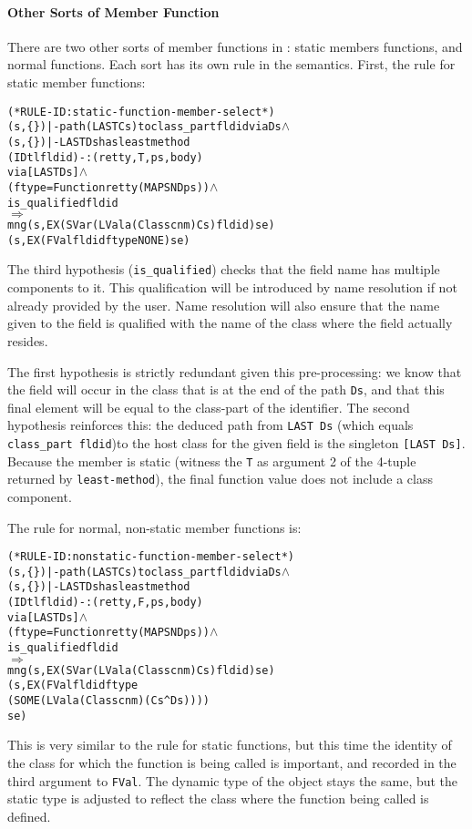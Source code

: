 \documentclass[11pt]{article}
\newcommand{\lbr}{\texttt{\{}}
\newcommand{\rbr}{\texttt{\}}}
\begin{document}
\paragraph{Other Sorts of Member Function}

There are two other sorts of member functions in \cpp{}: static
members functions, and normal functions.  Each sort has its own rule
in the semantics.    
First, the rule for static member functions: 
\begin{alltt}
(* RULE-ID: static-function-member-select *)
     (s,\lbr\rbr) |- path (LAST Cs) to class_part fldid via Ds \(\land\)
     (s,\lbr\rbr) |- LAST Ds has least method 
                  (IDtl fldid) -: (retty,T,ps,body)
                  via [LAST Ds] \(\land\)
     (ftype = Function retty (MAP SND ps)) \(\land\)
     is_qualified fldid
   \(\Rightarrow\)
     mng (s, EX (SVar (LVal a (Class cnm) Cs) fldid) se) 
         (s, EX (FVal fldid ftype NONE) se)
\end{alltt}
The third hypothesis (\texttt{is_qualified}) checks that the field
name has multiple components to it.  This qualification will be
introduced by name resolution if not already provided by the user.
Name resolution will also ensure that the name given to the field is
qualified with the name of the class where the field actually
resides.  

 The first hypothesis is
strictly redundant given this pre-processing: we know that the field
will occur in the class that is at the end of the path \texttt{Ds},
and that this final element will be equal to the class-part of the
identifier.  The second hypothesis reinforces this: the deduced path
from \texttt{LAST~Ds} (which equals \texttt{class_part~fldid})to the
host class for the given field is the singleton \texttt{[LAST~Ds]}. 
Because the member is static (witness the \texttt{T} as argument 2 of
the 4-tuple returned by \texttt{least-method}), the final function
value does not include a class component.

The rule for normal, non-static  member functions is:
\begin{alltt}
(* RULE-ID: nonstatic-function-member-select *)
     (s,\lbr\rbr) |- path (LAST Cs) to class_part fldid via Ds \(\land\)
     (s,\lbr\rbr) |- LAST Ds has least method 
                  (IDtl fldid) -: (retty,F,ps,body)
                  via [LAST Ds] \(\land\)
     (ftype = Function retty (MAP SND ps)) \(\land\)
     is_qualified fldid
   \(\Rightarrow\)
     mng (s, EX (SVar (LVal a (Class cnm) Cs) fldid) se) 
         (s, EX (FVal fldid ftype 
                      (SOME (LVal a (Class cnm) (Cs ^ Ds)))) 
                se)
\end{alltt}
This is very similar to the rule for static functions, but this time
the identity of the class for which the function is being called is
important, and recorded in the third argument to \texttt{FVal}.  The
dynamic type of the object stays the same, but the static type is
adjusted to reflect the class where the function being called is
defined. 
\end{document}
